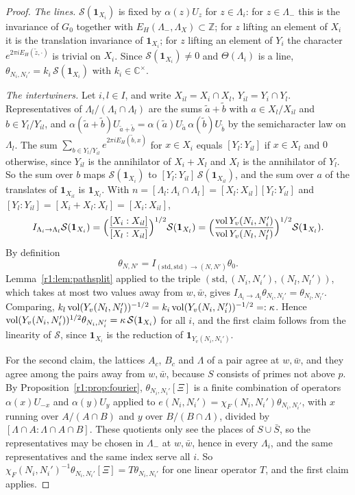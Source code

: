 \begin{proof}
\emph{The lines.} $\mathcal S(\mathbf 1_{X_i})$ is fixed by $\alpha(z)U_z$ for $z\in\Lambda_i$: for $z\in\Lambda_-$ this is the invariance of $G_0$ together with $E_H(\Lambda_-,\Lambda_X)\subset\mathbb Z$; for $z$ lifting an element of $X_i$ it is the translation invariance of $\mathbf 1_{X_i}$; for $z$ lifting an element of $Y_i$ the character $e^{2\pi iE_H(\tilde z,\cdot)}$ is trivial on $X_i$. Since $\mathcal S(\mathbf 1_{X_i})\ne0$ and $\Theta(\Lambda_i)$ is a line, $\theta_{N_i,N_i'}=k_i\,\mathcal S(\mathbf 1_{X_i})$ with $k_i\in\mathbb C^\times$.

\emph{The intertwiners.} Let $i,l\in I$, and write $X_{il}=X_i\cap X_l$, $Y_{il}=Y_i\cap Y_l$. Representatives of $\Lambda_l/(\Lambda_i\cap\Lambda_l)$ are the sums $\tilde a+\tilde b$ with $a\in X_l/X_{il}$ and $b\in Y_l/Y_{il}$, and $\alpha(\tilde a+\tilde b)U_{\tilde a+\tilde b}=\alpha(\tilde a)U_{\tilde a}\,\alpha(\tilde b)U_{\tilde b}$ by the semicharacter law on $\Lambda_l$. The sum $\sum_{b\in Y_l/Y_{il}}e^{2\pi iE_H(\tilde b,x)}$ for $x\in X_i$ equals $[Y_l:Y_{il}]$ if $x\in X_l$ and $0$ otherwise, since $Y_{il}$ is the annihilator of $X_i+X_l$ and $X_l$ is the annihilator of $Y_l$. So the sum over $b$ maps $\mathcal S(\mathbf 1_{X_i})$ to $[Y_l:Y_{il}]\,\mathcal S(\mathbf 1_{X_{il}})$, and the sum over $a$ of the translates of $\mathbf 1_{X_{il}}$ is $\mathbf 1_{X_l}$. With $n=[\Lambda_l:\Lambda_i\cap\Lambda_l]=[X_l:X_{il}][Y_l:Y_{il}]$ and $[Y_l:Y_{il}]=[X_i+X_l:X_l]=[X_i:X_{il}]$,
\[
I_{\Lambda_i\to\Lambda_l}\mathcal S(\mathbf 1_{X_i})=\Big(\frac{[X_i:X_{il}]}{[X_l:X_{il}]}\Big)^{1/2}\mathcal S(\mathbf 1_{X_l})=\Big(\frac{\operatorname{vol} Y_v(N_i,N_i')}{\operatorname{vol} Y_v(N_l,N_l')}\Big)^{1/2}\mathcal S(\mathbf 1_{X_l}).
\]
By definition
\[
\theta_{N,N'}=I_{(\mathrm{std},\mathrm{std})\to(N,N')}\theta_0.
\]
Lemma~\ref{r1:lem:pathsplit} applied to the triple $(\mathrm{std},(N_i,N_i'),(N_l,N_l'))$, which takes at most two values away from $w,\bar w$, gives $I_{\Lambda_i\to\Lambda_l}\theta_{N_i,N_i'}=\theta_{N_l,N_l'}$. Comparing, $k_l\operatorname{vol}(Y_v(N_l,N_l'))^{-1/2}=k_i\operatorname{vol}(Y_v(N_i,N_i'))^{-1/2}=:\kappa$. Hence $\operatorname{vol}(Y_v(N_i,N'_i))^{1/2}\theta_{N_i,N_i'}=\kappa\,\mathcal S(\mathbf 1_{X_i})$ for all $i$, and the first claim follows from the linearity of $\mathcal S$, since $\mathbf 1_{X_i}$ is the reduction of $\mathbf 1_{Y_v(N_i,N_i')}$.

For the second claim, the lattices $A_c$, $B_c$ and $\Lambda$ of a pair agree at $w,\bar w$, and they agree among the pairs away from $w,\bar w$, because $S$ consists of primes not above $p$. By Proposition~\ref{r1:prop:fourier}, $\theta_{N_i,N_i'}[\Xi]$ is a finite combination of operators $\alpha(x)U_{-x}$ and $\alpha(y)U_y$ applied to $e(N_i,N_i')=\chi_F(N_i,N_i')\theta_{N_i,N_i'}$, with $x$ running over $A/(A\cap B)$ and $y$ over $B/(B\cap\Lambda)$, divided by $[\Lambda\cap A:\Lambda\cap A\cap B]$. These quotients only see the places of $S\cup\bar S$, so the representatives may be chosen in $\Lambda_-$ at $w,\bar w$, hence in every $\Lambda_i$, and the same representatives and the same index serve all $i$. So $\chi_F(N_i,N_i')^{-1}\theta_{N_i,N_i'}[\Xi]=T\theta_{N_i,N_i'}$ for one linear operator $T$, and the first claim applies.
\end{proof}



